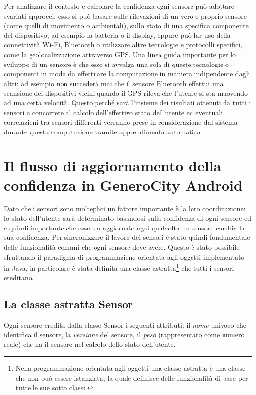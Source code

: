 Per analizzare il contesto e calcolare la confidenza ogni sensore può adottare svariati approcci: esso si può basare sulle rilevazioni di un vero e proprio sensore (come quelli di movimento o ambientali), sullo stato di una specifica componente del dispositivo, ad esempio la batteria o il display, oppure può far uso della connettività Wi-Fi, Bluetooth o utilizzare altre tecnologie e protocolli specifici, come la geolocalizzazione attraverso GPS. Una linea guida importante per lo sviluppo di un sensore è che esso si avvalga una sola di queste tecnologie o componenti in modo da effettuare la computazione in maniera indipendente dagli altri: ad esempio non succederà mai che il sensore Bluetooth effettui una scansione dei dispositivi vicini quando il GPS rileva che l'utente si sta muovendo ad una certa velocità. Questo perché sarà l'insieme dei risultati ottenuti da tutti i sensori a concorrere al calcolo dell'effettivo stato dell'utente ed eventuali correlazioni tra sensori differenti verranno prese in considerazione dal sistema durante questa computazione tramite apprendimento automatico.


\section{Il flusso di aggiornamento della confidenza in GeneroCity Android}
Dato che i sensori sono molteplici un fattore importante è la loro coordinazione: lo stato dell'utente sarà determinato basandosi sulla confidenza di ogni sensore ed è quindi importante che esso sia aggiornato ogni qualvolta un sensore cambia la sua confidenza. Per sincronizzare il lavoro dei sensori è stato quindi fondamentale delle funzionalità comuni che ogni sensore deve avere. Questo è stato possibile sfruttando il paradigma di programmazione orientata agli oggetti implementato in Java\cite{Java}, in particolare è stata definita una classe astratta\footnote{Nella programmazione orientata agli oggetti una classe astratta è una classe che non può essere istanziata, la quale definisce delle funzionalità di base per tutte le sue sotto classi.} che tutti i sensori ereditano.

\subsection{La classe astratta Sensor}
Ogni sensore eredita dalla classe Sensor i seguenti attributi: il \textit{nome} univoco che identifica il sensore, la \textit{versione} del sensore, il \textit{peso} (rappresentato come numero reale) che ha il sensore nel calcolo dello stato dell'utente.

